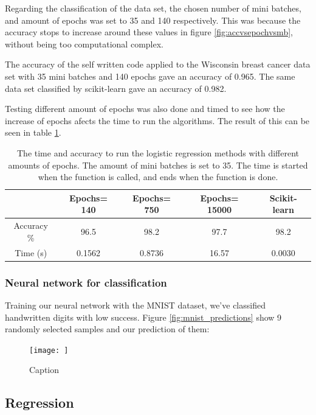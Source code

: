 \documentclass[../main.tex]{subfiles}
\begin{document}
Regarding the classification of the data set, the chosen number of mini batches, and amount of epochs was set to 35 and 140 respectively. This was because the accuracy stops to increase around these values in figure \ref{fig:accvsepochvsmb}, without being too computational complex. 

The accuracy of the self written code applied to the Wisconsin breast cancer data set with 35 mini batches and 140 epochs gave an accuracy of 0.965. The same data set classified by scikit-learn gave an accuracy of 0.982.

Testing different amount of epochs was also done and timed to see how the increase of epochs afects the time to run the algorithms. The result of this can be seen in table \ref{tab:timetime}.


\begin{table}[H]
\centering
\caption{The time and accuracy to run the logistic regression methods with different amounts of epochs. The amount of mini batches is set to 35. The time is started when the function is called, and ends when the function is done.}
\begin{tabular}{ ccccc } 
 \toprule
  & Epochs= 140 & Epochs= 750 & Epochs= 15000 & Scikit-learn \\ 
 \midrule
 Accuracy \%  & 96.5 & 98.2 & 97.7 & 98.2\\
 
 Time (s) & 0.1562 & 0.8736 & 16.57 & 0.0030 \\ 
 \bottomrule
\end{tabular}
\label{tab:timetime}
\end{table}


\subsubsection{Neural network for classification}

Training our neural network with the MNIST dataset, we've classified handwritten digits with low success. Figure \ref{fig:mnist_predictions} show 9 randomly selected samples and our prediction of them:

\begin{figure}
    \centering
    \texttt{[image: ]}
    \caption{Caption}
    \label{fig:my_label}
\end{figure}

\subsection{Regression}
\end{document}
